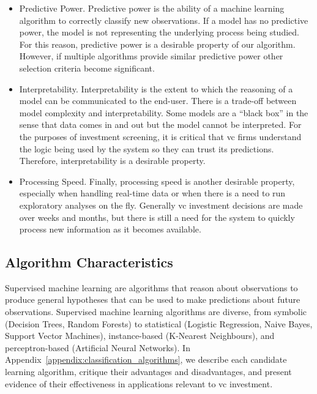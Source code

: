 \documentclass[../thesis/thesis.tex]{subfiles}
\begin{document}
\begin{itemize}

\item Predictive Power. Predictive power is the ability of a machine learning algorithm to correctly classify new observations. If a model has no predictive power, the model is not representing the underlying process being studied. For this reason, predictive power is a desirable property of our algorithm. However, if multiple algorithms provide similar predictive power other selection criteria become significant.

\item Interpretability. Interpretability is the extent to which the reasoning of a model can be communicated to the end-user. There is a trade-off between model complexity and interpretability. Some models are a ``black box'' in the sense that data comes in and out but the model cannot be interpreted. For the purposes of investment screening, it is critical that \gls{vc} firms understand the logic being used by the system so they can trust its predictions. Therefore, interpretability is a desirable property.

\item Processing Speed. Finally, processing speed is another desirable property, especially when handling real-time data or when there is a need to run exploratory analyses on the fly. Generally \gls{vc} investment decisions are made over weeks and months, but there is still a need for the system to quickly process new information as it becomes available.

\end{itemize}

\subsection{Algorithm Characteristics}

Supervised machine learning are algorithms that reason about observations to produce general hypotheses that can be used to make predictions about future observations. Supervised machine learning algorithms are diverse, from symbolic (Decision Trees, Random Forests) to statistical (Logistic Regression, Naive Bayes, Support Vector Machines), instance-based (K-Nearest Neighbours), and perceptron-based (Artificial Neural Networks). In Appendix~\ref{appendix:classification_algorithms}, we describe each candidate learning algorithm, critique their advantages and disadvantages, and present evidence of their effectiveness in applications relevant to \gls{vc} investment.
\end{document}
